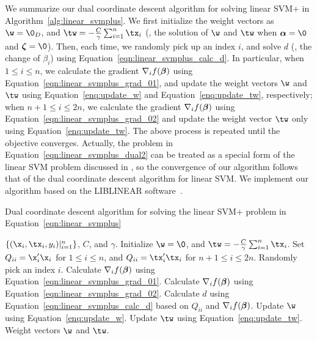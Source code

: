 We summarize our dual coordinate descent algorithm for solving linear SVM+ in Algorithm~\ref{alg:linear_svmplus}. We first initialize the weight vectors as $\w = \0_{D}$, and $\tw = -\frac{C}{\gamma}\sum_{i=1}^n\tx_i$ (\ie, the solution of $\w$ and $\tw$ when $\ba = \0$ and $\bz = \0$). Then, each time, we randomly pick up an index $i$, and solve $d$ (\ie, the change of $\beta_i$) using Equation~\ref{eqn:linear_svmplus_calc_d}. In particular, when $1 \leq i \leq n$, we calculate the gradient $\nabla_if(\bm{\beta})$ using Equation~\ref{eqn:linear_svmplus_grad_01}, and update the weight vectors $\w$ and $\tw$ using Equation~\ref{enq:update_w} and Equation~\ref{enq:update_tw}, respectively; when $n+1 \leq i \leq 2n$, we calculate the gradient $\nabla_if(\bm{\beta})$ using Equation~\ref{eqn:linear_svmplus_grad_02} and update the weight vector $\tw$ only using Equation~\ref{enq:update_tw}. The above process is repeated until the objective converges. Actually, the problem in Equation~\ref{eqn:linear_svmplus_dual2} can be treated as a special form of the linear SVM problem discussed in \citep{DCD_linearsvm}, so the convergence of our algorithm follows that of the dual coordinate descent algorithm for linear SVM. We implement our algorithm based on the LIBLINEAR software~\citep{liblinear}.
\begin{algorithm}[t]
   \caption{Dual coordinate descent algorithm for solving the linear SVM+ problem in Equation~\ref{eqn:linear_svmplus}}
   \label{alg:linear_svmplus}
   \begin{algorithmic}[1]
   \REQUIRE  $\{(\x_i, \tx_i, y_i)|_{i=1}^n\}$,  $C$, and $\gamma$.
   \STATE Initialize $\w = \0$, and $\tw = -\frac{C}{\gamma}\sum_{i=1}^n\tx_i$.
   \STATE Set $Q_{ii} = \x_i'\x_i$ for $1 \leq i \leq n$, and $Q_{ii} = \tx_i'\tx_i$ for $n+1\leq i \leq 2n$.
   \REPEAT
      \STATE Randomly pick an index $i$.
      \STATE  Calculate $\nabla_if(\bm{\beta})$ using Equation~\ref{eqn:linear_svmplus_grad_01}.
      \ELSE
      \STATE  Calculate $\nabla_if(\bm{\beta})$ using Equation~\ref{eqn:linear_svmplus_grad_02}.
      \ENDIF
      \STATE Calculate $d$ using Equation~\ref{eqn:linear_svmplus_calc_d} based on $Q_{ii}$ and $\nabla_if(\bm{\beta})$.
        \STATE       Update $\w$ using Equation~\ref{enq:update_w}.
      \ENDIF
      \STATE Update $\tw$ using Equation~\ref{enq:update_tw}.
   \ENSURE Weight vectors $\w$ and $\tw$.
\end{algorithmic}
\end{algorithm}

